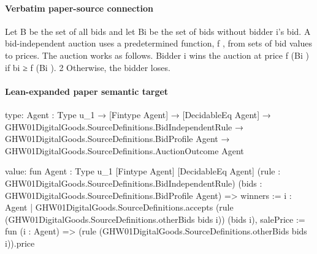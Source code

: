 \documentclass[10pt]{article}
\begin{document}
\paragraph{Verbatim paper-source connection}
\begin{ReviewVerbatim}
Let B be the set of all bids and let Bi be the set
of bids without bidder i’s bid. A bid-independent
auction uses a predetermined function, f , from sets
of bid values to prices. The auction works as follows.
Bidder i wins the auction at price f (Bi ) if bi ≥ f (Bi ).
2
Otherwise, the bidder loses.
\end{ReviewVerbatim}



\paragraph{Lean-expanded paper semantic target}
\begin{ReviewVerbatim}
type:
{Agent : Type u_1} →
  [Fintype Agent] →
    [DecidableEq Agent] →
      GHW01DigitalGoods.SourceDefinitions.BidIndependentRule →
        GHW01DigitalGoods.SourceDefinitions.BidProfile Agent → GHW01DigitalGoods.SourceDefinitions.AuctionOutcome Agent

value:
fun {Agent : Type u_1} [Fintype Agent] [DecidableEq Agent]
    (rule : GHW01DigitalGoods.SourceDefinitions.BidIndependentRule)
    (bids : GHW01DigitalGoods.SourceDefinitions.BidProfile Agent) =>
  {
    winners :=
      {i : Agent |
        GHW01DigitalGoods.SourceDefinitions.accepts (rule (GHW01DigitalGoods.SourceDefinitions.otherBids bids i))
          (bids i)},
    salePrice := fun (i : Agent) => (rule (GHW01DigitalGoods.SourceDefinitions.otherBids bids i)).price }
\end{ReviewVerbatim}
\end{document}
